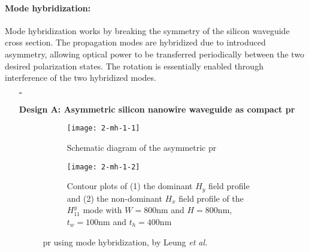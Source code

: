 \documentclass[../report.tex]{subfiles}
\begin{document}
			\paragraph*{Mode hybridization:}
Mode hybridization works by breaking the symmetry of the silicon waveguide cross section. The propagation modes are hybridized due to introduced asymmetry, allowing optical power to be transferred periodically between the two desired polarization states. The rotation is essentially enabled through interference of the two hybridized modes. 
\begin{itemize}[leftmargin=*]
	
	\item[$\square$] \begin{minipage}[t]{\textwidth}\textbf{Design A: Asymmetric silicon nanowire waveguide as compact \gls{pr}}
	\begin{figure}[H] %
		\begin{subfigure}[t]{0.45\textwidth}
			\texttt{[image: 2-mh-1-1]}
			\caption{Schematic diagram of the asymmetric \gls{pr}}
			\label{fig:2_mh_1_1}
		\end{subfigure}
		\hfill
		\begin{subfigure}[t]{0.45\textwidth}
			\texttt{[image: 2-mh-1-2]}
			\caption{Contour plots of (1) the dominant $H_y$ field profile and (2) the non-dominant $H_x$ field profile of the $H_{11}^{y}$ mode with $W=800 \si{\nano\meter}$ and $H=800 \si{\nano\meter}$, $t_w=100 \si{\nano\meter}$ and $t_h=400 \si{\nano\meter}$}
			\label{fig:2_mh_1_2}
		\end{subfigure}
		\caption{\gls{pr} using mode hybridization, by Leung \textit{et al.} \cite{leung_numerical_2011}}
	\end{figure}
	\end{minipage}\\\\

\end{itemize}
\end{document}
